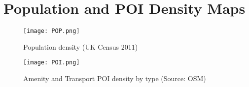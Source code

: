\section*{Population and POI Density Maps}
\begin{figure}
    \centering
    \texttt{[image: POP.png]}
    \caption{Population density (UK Census 2011)}
    \label{fig:pop}
\end{figure}

\begin{figure}
    \centering
    \texttt{[image: POI.png]}
    \caption{Amenity and Transport POI density by type (Source: OSM)}
    \label{fig:poi}
\end{figure}